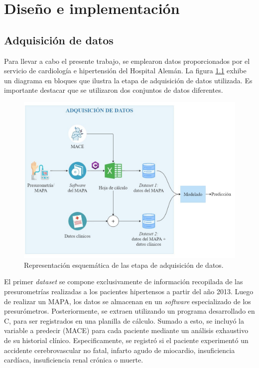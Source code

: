 \chapter{Diseño e implementación} %

\label{Chapter3} %
\section{Adquisición de datos}
 
\newcommand{\myhash}{\raisebox{\depth}{\#}}

Para llevar a cabo el presente trabajo, se emplearon datos proporcionados por el servicio 
de cardiología e hipertensión del Hospital Alemán. La figura \ref{fig:adquisicion_datos} 
exhibe un diagrama en bloques que ilustra la etapa de adquisición de datos utilizada. 
Es importante destacar que se utilizaron dos conjuntos de datos diferentes. 

\begin{figure}[ht]
	\centering
	\includegraphics[width=\textwidth]{./Figures/adquisicion_datos2.jpg}
	\caption{Representación esquemática de las etapa de adquisición de datos.}\label{fig:adquisicion_datos}
\end{figure}

El primer \emph{dataset} se compone exclusivamente de información recopilada de las 
presurometrías realizadas a los pacientes hipertensos a partir del año 2013. Luego 
de realizar un MAPA, los datos se almacenan en un \emph{software} especializado de 
los presurómetros. Posteriormente, se extraen utilizando un programa desarrollado 
en C\myhash, para ser registrados en una planilla de cálculo. Sumado a esto, se incluyó 
la variable a predecir (MACE) para cada paciente mediante un análisis exhaustivo 
de su historial clínico. Especificamente, se registró si el paciente experimentó 
un accidente cerebrovascular no fatal, infarto agudo de miocardio, insuficiencia 
cardíaca, insuficiencia renal crónica o muerte.

